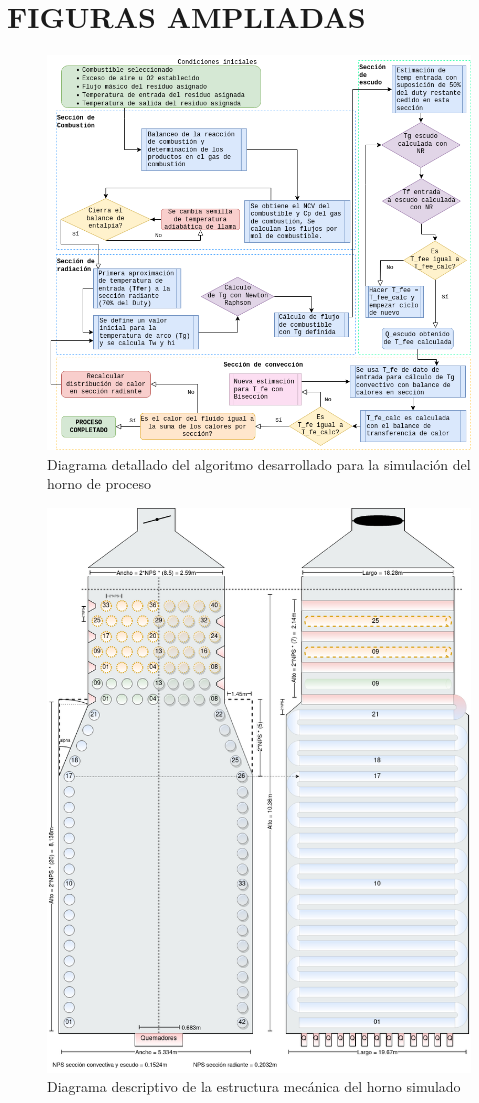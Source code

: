 \chapter{FIGURAS AMPLIADAS}\label{apx:img}

\begin{figure}[ht]
\includegraphics[scale=0.55,angle=0]{images/diagrama-algo}
\caption[Diagrama Algoritmo Ampliado]{Diagrama detallado del algoritmo desarrollado para la simulación del horno de proceso}\label{img:dia-algo-full}
\end{figure}

\begin{figure}[ht]
\includegraphics[scale=0.55,angle=0]{images/diagrama-vista}
\caption[Diagrama Mecánico Ampliado]{Diagrama descriptivo de la estructura mecánica del horno simulado}\label{img:dia-meca-full}
\end{figure}